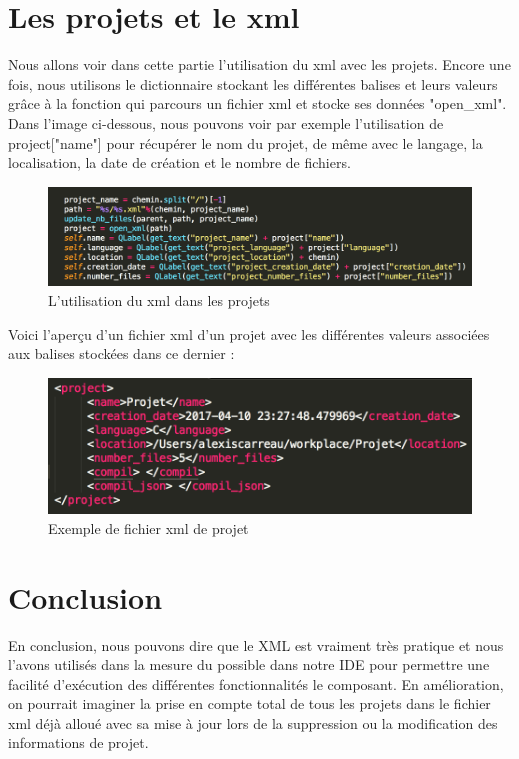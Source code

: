 \documentclass[a4paper,12pt]{article}
\begin{document}
\section{Les projets et le xml}

Nous allons voir dans cette partie l'utilisation du xml avec les projets. Encore une fois, nous utilisons le dictionnaire stockant les différentes balises et leurs valeurs grâce à la fonction qui parcours un fichier xml et stocke ses données "open\_xml". Dans l'image ci-dessous, nous pouvons voir par exemple l'utilisation de project["name"] pour récupérer le nom du projet, de même avec le langage, la localisation, la date de création et le nombre de fichiers.

\begin{figure}[h!]
			\begin{center}
				\includegraphics[scale=0.6]{images/projet.png}
				\caption{L'utilisation du xml dans les projets}
			\end{center}
		\end{figure}
		
Voici l'aperçu d'un fichier xml d'un projet avec les différentes valeurs associées aux balises stockées dans ce dernier :

\begin{figure}[h!]
			\begin{center}
				\includegraphics[scale=0.6]{images/projet_xml.png}
				\caption{Exemple de fichier xml de projet}
			\end{center}
		\end{figure}
	
\section{Conclusion}

En conclusion, nous pouvons dire que le XML est vraiment très pratique et nous l'avons utilisés dans la mesure du possible dans notre IDE pour permettre une facilité d'exécution des différentes fonctionnalités le composant. En amélioration, on pourrait imaginer la prise en compte total de tous les projets dans le fichier xml déjà alloué avec sa mise à jour lors de la suppression ou la modification des informations de projet.
		
\end{document}
